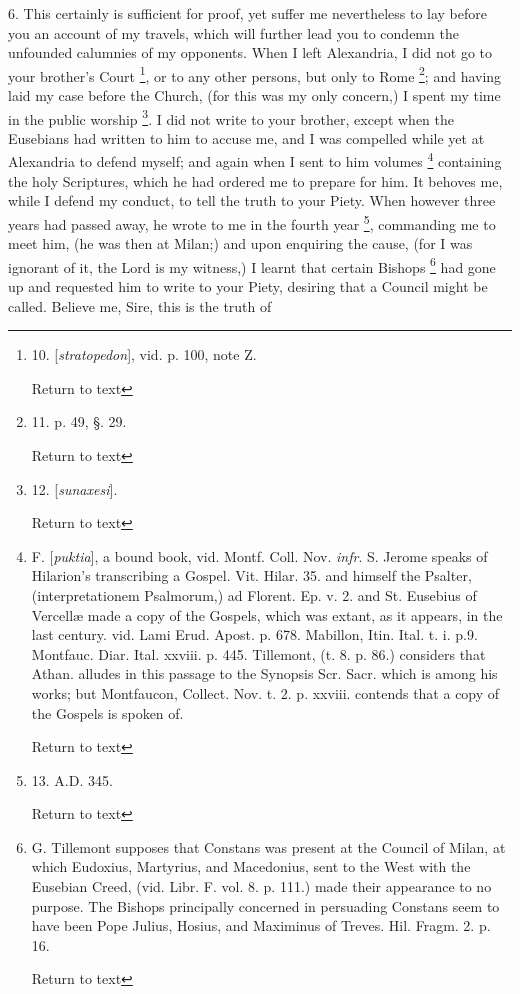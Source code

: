6. This certainly is sufficient for proof, yet suffer me nevertheless to
lay before you an account of my travels, which will further lead you
to condemn the unfounded calumnies of my opponents. When I left
Alexandria, I did not go to your brother's Court \footnote{10. [\emph{stratopedon}], vid. p. 100, note Z.

Return to text}, or to any other persons, but only to Rome \footnote{11. p. 49, §. 29.

Return to text}; and having laid my case before the Church, (for this was my
only concern,) I spent my time in the public worship \footnote{12. [\emph{sunaxesi}].

Return to text}. I did not write to your brother, except when the Eusebians
had written to him to accuse me, and I was compelled while yet at
Alexandria to defend myself; and again when I sent to him volumes \footnote{F. [\emph{puktia}], a bound book, vid. Montf. Coll. Nov. \emph{infr}.
S. Jerome speaks of Hilarion's transcribing a Gospel. Vit. Hilar. 35.
and himself the Psalter, (interpretationem Psalmorum,) ad Florent. Ep.
v. 2. and St. Eusebius of Vercellæ made a copy of the Gospels, which
was extant, as it appears, in the last century. vid. Lami Erud. Apost.
p. 678. Mabillon, Itin. Ital. t. i. p.9. Montfauc. Diar. Ital. xxviii.
p. 445. Tillemont, (t. 8. p. 86.) considers that Athan. alludes in
this passage to the Synopsis Scr. Sacr. which is among his works; but
Montfaucon, Collect. Nov. t. 2. p. xxviii. contends that a copy of the
Gospels is spoken of.

Return to text} containing the holy Scriptures, which he had ordered me to
prepare for him. It behoves me, while I defend my conduct, to tell the
truth to your Piety. When however three years had passed away, he
wrote to me in the fourth year \footnote{13. A.D.
345.

Return to text}, commanding me to meet him, (he was then at Milan;) and upon
enquiring the cause, (for I was ignorant of it, the Lord is my
witness,) I learnt that certain Bishops \footnote{G. Tillemont supposes that Constans was present at the Council of Milan,
at which Eudoxius, Martyrius, and Macedonius, sent to the West with
the Eusebian Creed, (vid. Libr. F. vol. 8. p. 111.) made their
appearance to no purpose. The Bishops principally concerned in
persuading Constans seem to have been Pope Julius, Hosius, and
Maximinus of Treves. Hil. Fragm. 2. p. 16.

Return to text} had gone up and requested him to write to your Piety, desiring
that a Council might be called. Believe me, Sire, this is the truth of
